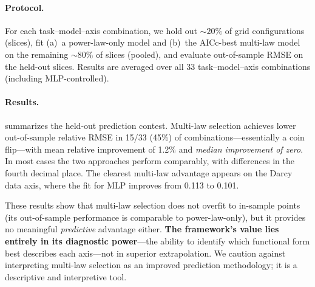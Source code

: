 \documentclass[11pt]{article}
\newcommand{\holdoutWinFraction}{15/33 (45\%)}
\newcommand{\holdoutMeanImprovement}{1.2\%}
\begin{document}
\paragraph{Protocol.}
For each task--model--axis combination, we hold out ${\sim}20\%$ of
grid configurations (slices), fit (a)~a power-law-only model and
(b)~the AICc-best multi-law model on the remaining ${\sim}80\%$ of
slices (pooled), and evaluate out-of-sample RMSE on the held-out
slices. Results are averaged over all 33 task--model--axis
combinations (including MLP-controlled).

\paragraph{Results.}
 summarizes the held-out prediction contest.
Multi-law selection achieves lower out-of-sample relative RMSE in
\holdoutWinFraction{} of combinations---essentially a coin flip---with
mean relative improvement of \holdoutMeanImprovement{} and
\emph{median improvement of zero}. In most cases the two approaches
perform comparably, with differences in the fourth decimal place.
The clearest multi-law advantage appears on the Darcy data axis,
where the fit for MLP improves from 0.113 to 0.101.

These results show that multi-law selection does not overfit to
in-sample points (its out-of-sample performance is comparable to
power-law-only), but it provides no meaningful \emph{predictive}
advantage either. \textbf{The framework's value lies entirely in its
diagnostic power}---the ability to identify which functional form
best describes each axis---not in superior extrapolation.
We caution against interpreting multi-law selection as an improved
prediction methodology; it is a descriptive and interpretive tool.
\end{document}
